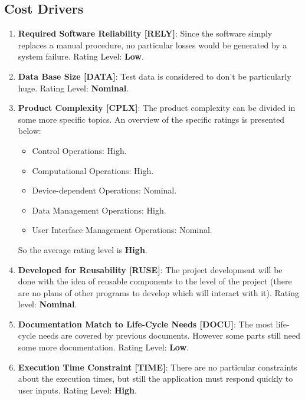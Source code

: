 \subsection{Cost Drivers}
    \begin{enumerate}
        \item \textbf{Required Software Reliability [RELY]}: Since the software simply replaces a manual procedure, no particular losses would be generated by a system failure. Rating Level: \textbf{Low}.
        
        \item \textbf{Data Base Size [DATA]}: Test data is considered to don't be particularly huge. Rating Level: \textbf{Nominal}.
        
        \item \textbf{Product Complexity [CPLX]}:
        The product complexity can be divided in some more specific topics. An overview of the specific ratings is presented below:
        \begin{itemize}
            \item Control Operations: High.
            \item Computational Operations: High.
            \item Device-dependent Operations: Nominal.
            \item Data Management Operations: High.
            \item User Interface Management Operations: Nominal.
        \end{itemize}
            
        So the average rating level is \textbf{High}.
        
        \item \textbf{Developed for Reusability [RUSE]}: The project development will be done with the idea of reusable components to the level of the project (there are no plans of other programs to develop which will interact with it). Rating level: \textbf{Nominal}.
        
        \item \textbf{Documentation Match to Life-Cycle Needs [DOCU]}: The most life-cycle needs are covered by previous documents. However some parts still need some more documentation. Rating Level: \textbf{Low}.
        
        \item \textbf{Execution Time Constraint [TIME]}: There are no particular constraints about the execution times, but still the application must respond quickly to user inputs. Rating Level: \textbf{High}.
        

\end{enumerate}
